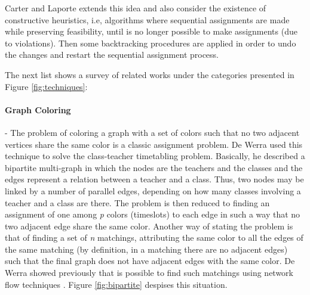 Carter and Laporte \citep{recent_dev_patat} extends this idea and also consider the existence of constructive heuristics, i.e, algorithms where sequential assignments are made while preserving feasibility, until is no longer possible to make assignments (due to violations). Then some backtracking procedures are applied in order to undo the changes and restart the sequential assignment process.

The next list shows a survey of related works under the categories presented in Figure \ref{fig:techniques}:

\paragraph{\textbf{Graph Coloring}} - The problem of coloring a graph with a set of colors such that no two adjacent vertices share the same color is a classic assignment problem. De Werra \citep{introduction_timetable} used this technique to solve the class-teacher timetabling problem. Basically, he described a bipartite multi-graph in which the nodes are the teachers and the classes and the edges represent a relation between a teacher and a class. Thus, two nodes may be linked by a number of parallel edges, depending on how many classes involving a teacher and a class are there. The problem is then reduced to finding an assignment of one among \textit{p} colors (timeslots) to each edge in such a way that no two adjacent edge share the same color. Another way of stating the problem is that of finding a set of \textit{n} matchings, attributing the same color to all the edges of the same matching (by definition, in a matching there are no adjacent edges) such that the final graph does not have adjacent edges with the same color. De Werra showed previously that is possible to find such matchings using network flow techniques \citep{deWerra}. 
	Figure \ref{fig:bipartite} despises this situation.\par
